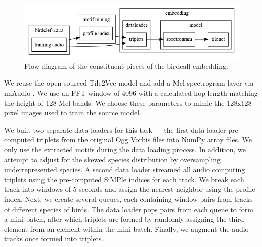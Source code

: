 \documentclass[
]{ceurart}
\begin{document}
\begin{figure}[hbt!]
\centering


\includegraphics[width=\textwidth]{figures/flow-diagram.png}
\caption{Flow diagram of the constituent pieces of the birdcall embedding.}
\end{figure}

We reuse the open-sourced Tile2Vec model and add a Mel spectrogram layer via nnAudio \cite{nn-audio}. We use an FFT window of 4096 with a calculated hop length matching the height of 128 Mel bands. We choose these parameters to mimic the 128x128 pixel images used to train the source model.

We built two separate data loaders for this task — the first data loader pre-computed triplets from the original Ogg Vorbis files into NumPy array files. We only use the extracted motifs during the data loading process. In addition, we attempt to adjust for the skewed species distribution by oversampling underrepresented species. A second data loader streamed all audio computing triplets using the pre-computed SiMPle indices for each track. We break each track into windows of 5-seconds and assign the nearest neighbor using the profile index. Next, we create several queues, each containing window pairs from tracks of different species of birds. The data loader pops pairs from each queue to form a mini-batch, after which triplets are formed by randomly assigning the third element from an element within the mini-batch. Finally, we augment the audio tracks once formed into triplets.
\end{document}
